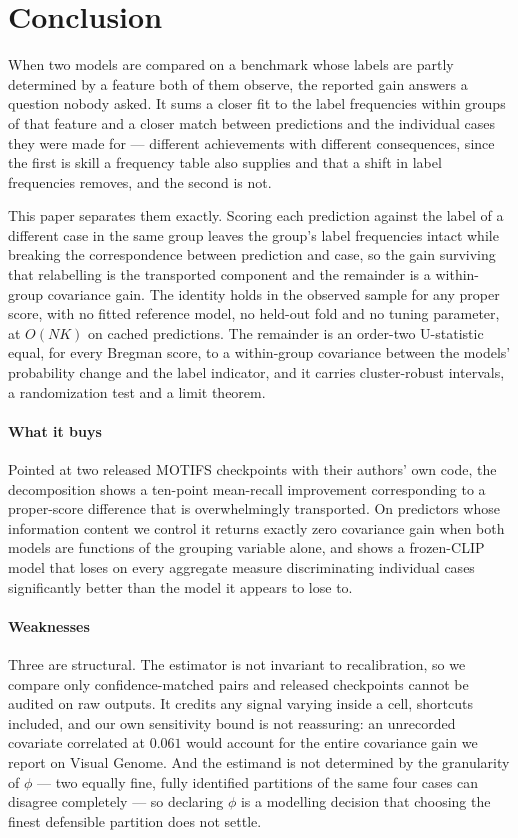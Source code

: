 \section{Conclusion}\label{sec:conclusion}

When two models are compared on a benchmark whose labels are partly determined by a feature
both of them observe, the reported gain answers a question nobody asked. It sums a closer fit
to the label frequencies within groups of that feature and a closer match between predictions
and the individual cases they were made for --- different achievements with different
consequences, since the first is skill a frequency table also supplies and that a shift in
label frequencies removes, and the second is not.

This paper separates them exactly. Scoring each prediction against the label of a
different case in the same group leaves the group's label frequencies intact while breaking
the correspondence between prediction and case, so the gain surviving that relabelling is
the transported component and the remainder is a within-group covariance gain. The identity
holds in the observed sample for any proper score, with no fitted reference model, no
held-out fold and no tuning parameter, at $O(NK)$ on cached predictions. The remainder is an
order-two U-statistic equal, for every Bregman score, to a within-group covariance between
the models' probability change and the label indicator, and it carries cluster-robust
intervals, a randomization test and a limit theorem.

\paragraph{What it buys} Pointed at two released MOTIFS checkpoints with their authors' own
code, the decomposition shows a ten-point mean-recall improvement corresponding to a
proper-score difference that is overwhelmingly transported. On predictors whose information
content we control it returns exactly zero covariance gain when both models are functions of
the grouping variable alone, and shows a frozen-CLIP model that loses on every aggregate
measure discriminating individual cases significantly better than the model it appears to
lose to.

\paragraph{Weaknesses} Three are structural. The estimator is not invariant to
recalibration, so we compare only confidence-matched pairs and released checkpoints cannot be
audited on raw outputs. It credits any signal varying inside a cell, shortcuts included, and
our own sensitivity bound is not reassuring: an unrecorded covariate correlated at $0.061$
would account for the entire covariance gain we report on Visual Genome. And the estimand is
not determined by the granularity of $\phi$ --- two equally fine, fully identified partitions
of the same four cases can disagree completely --- so declaring $\phi$ is a modelling decision
that choosing the finest defensible partition does not settle.

